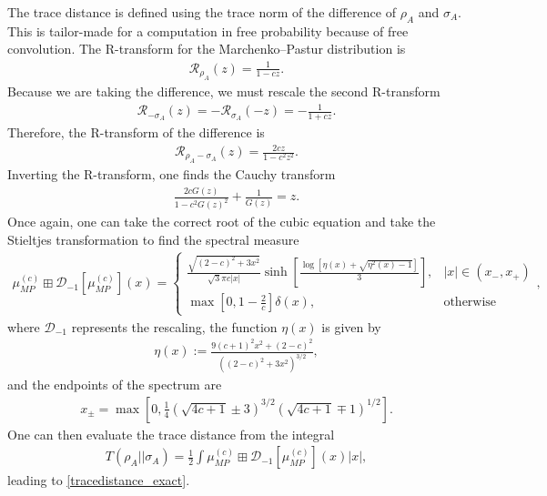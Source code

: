 \documentclass[a4paper,11pt]{article}
\begin{document}
The trace distance is defined using the trace norm of the difference of $\rho_A$ and $\sigma_A$. This is tailor-made for a computation in free probability because of free convolution. The R-transform for the Marchenko–Pastur distribution is 
\begin{align}
    \mathcal{R}_{\rho_A}(z) =  \frac{1}{1-c z}.
\end{align}
Because we are taking the difference, we must rescale the second R-transform
\begin{align}
    \mathcal{R}_{-\sigma_A}(z) = -\mathcal{R}_{\sigma_A}(-z)= -\frac{1}{1+c z}.
\end{align}
Therefore, the R-transform of the difference is
\begin{align}
    \mathcal{R}_{\rho_A-\sigma_A}(z) = \frac{2cz}{1-c^2z^2}.
\end{align}
Inverting the R-transform, one finds the Cauchy transform
\begin{align}
    \frac{2cG(z)}{1-c^2G(z)^2}+\frac{1}{G(z)}=z.
\end{align}
Once again, one can take the correct root of the cubic equation and take the Stieltjes transformation to find the spectral measure \cite{2016PhRvA..93f2112P, 2015arXiv151107278M}
\begin{align}
    \mu_{MP}^{(c)}\boxplus\mathcal{D}_{-1}\left[\mu_{MP}^{(c)}\right](x)= \begin{cases}
    \frac{\sqrt{(2-c)^2+3x^2}}{\sqrt{3}\pi c |x|} \sinh\left[\frac{\log\left[ \eta(x)+\sqrt{\eta^2(x)-1}\right]}{3} \right],& |x| \in  (x_-,x_+)
    \\
    \max\left[0,1-\frac{2}{c} \right]\delta(x),& \text{otherwise}
    \end{cases},
\end{align}
where $\mathcal{D}_{-1}$ represents the rescaling, the function $\eta(x)$ is given by
\begin{align}
    \eta(x):= \frac{9(c+1)^2x^2+(2-c)^2}{((2-c)^2+3x^2)^{3/2}},
\end{align}
and the endpoints of the spectrum are
\begin{align}
    x_\pm = \max\left[0, \frac{1}{4}\left( \sqrt{4c+1}\pm3\right)^{3/2}\left( \sqrt{4c+1}\mp 1\right)^{1/2} \right].
\end{align}
One can then evaluate the trace distance from the integral
\begin{align}
    T(\rho_A ||\sigma_A) = \frac{1}{2}\int \mu_{MP}^{(c)}\boxplus\mathcal{D}_{-1}\left[\mu_{MP}^{(c)}\right](x) |x|,
\end{align}
leading to \eqref{tracedistance_exact}.
\end{document}
